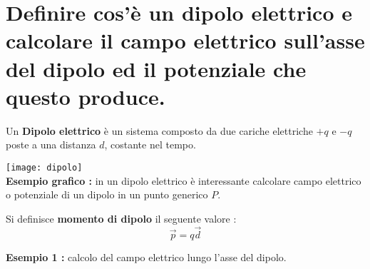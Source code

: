 \section{Definire cos'\`e un dipolo elettrico e calcolare il campo
	elettrico sull'asse del dipolo ed il potenziale che questo
	produce.}
Un \textbf{Dipolo elettrico} \`e un sistema composto da due cariche elettriche $+q$ e $-q$ poste a una distanza $d$, costante nel tempo.

\begin{center}
	\texttt{[image: dipolo]} \\
	\textbf{Esempio grafico :} in un dipolo elettrico \`e interessante calcolare campo elettrico o potenziale di un dipolo in un punto generico $P$.
\end{center}

Si definisce \textbf{momento di dipolo} il seguente valore : 
\begin{equation}
    \vec{p} = q\vec{d}
\end{equation}

\textbf{Esempio 1 :} calcolo del campo elettrico lungo l'asse del dipolo.\\


